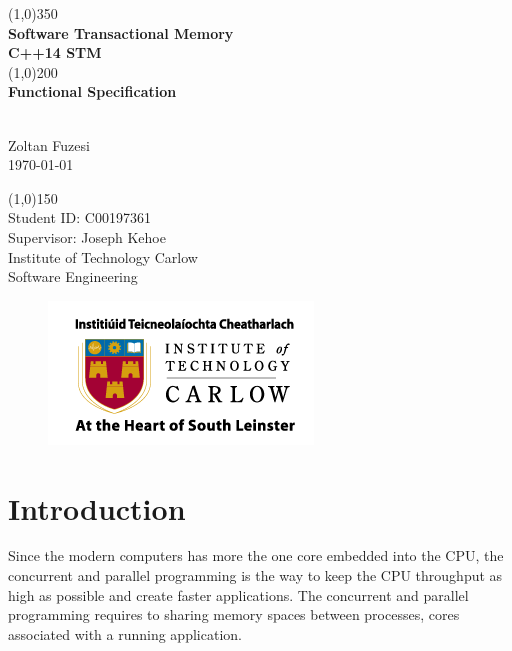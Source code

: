 \documentclass[12pt]{article}
\begin{document}
\begin{titlepage}
	\begin{center}
	\line(1,0){350}\\
	[0.3 cm]
	\huge{\textbf{Software Transactional Memory\\[0.3 cm]C++14 STM\\ }} 
	\line(1,0){200}\\
	[0.3 cm]
	\huge{\textbf{Functional Specification }} 
		\begin{LARGE}
		\\[0.3 cm]Zoltan Fuzesi\\
		\today
		\end{LARGE}
		
		\begin{LARGE}
		\line(1,0){150}\\
		[1.0 cm]
		Student ID: C00197361\\
		Supervisor: Joseph Kehoe\\
		\color{gray}Institute of Technology Carlow\\
		\color{gray}Software Engineering
		\end{LARGE}
		
\begin{figure}[h!]
\centering
\includegraphics[scale=0.7]{Pictures/carlow.png}
\end{figure}
		
	\end{center}
\end{titlepage}

\tableofcontents


\clearpage
{}
\setcounter{page}{1}
\section{Introduction}
Since the modern computers has more the one core embedded into the CPU, the concurrent and parallel programming is the way to keep the CPU throughput as high as possible and create faster applications. The concurrent and parallel programming requires to sharing memory spaces between processes, cores associated with a running application.\\
\end{document}
